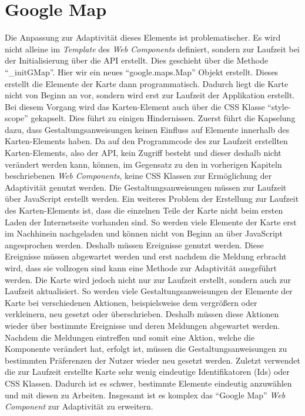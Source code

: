 \documentclass[12pt, paper=a4, bibtotoc, toc=listof, headsepline=true]{scrreprt}
\begin{document}
	\section{Google Map}
	\label{sec:fazGogMap}
	Die Anpassung zur Adaptivität dieses Elements ist problematischer.
	Es wird nicht alleine im \emph{Template} des \emph{Web Components} definiert, sondern zur Laufzeit bei der Initialisierung über die \ac{API} erstellt. Dies geschieht über die Methode \enquote{\_initGMap}. Hier wir ein neues \enquote{google.maps.Map} Objekt erstellt. Dieses erstellt die Elemente der Karte dann programmatisch. Dadurch liegt die Karte nicht von Beginn an vor, sondern wird erst zur Laufzeit der Applikation erstellt. Bei diesem Vorgang wird das Karten-Element auch über die \ac{CSS} Klasse \enquote{style-scope} gekapselt. Dies führt zu einigen Hindernissen. Zuerst führt die Kapselung dazu, dass Gestaltungsanweisungen keinen Einfluss auf Elemente innerhalb des Karten-Elements haben. Da auf den Programmcode des zur Laufzeit erstellten Karten-Elements, also der \ac{API}, kein Zugriff besteht und dieser deshalb  nicht verändert werden kann, können, im Gegensatz zu den in vorherigen Kapiteln beschriebenen \emph{Web Components}, keine \ac{CSS} Klassen zur Ermöglichung der Adaptivität genutzt werden. Die Gestaltungsanweisungen müssen zur Laufzeit über JavaScript erstellt werden. Ein weiteres Problem der Erstellung zur Laufzeit des Karten-Elements ist, dass die einzelnen Teile der Karte nicht beim ersten Laden der Internetseite vorhanden sind. So werden viele Elemente der Karte erst im Nachhinein nachgeladen und können nicht von Beginn an über JavaScript angesprochen werden. Deshalb müssen Ereignisse genutzt werden. Diese Ereignisse müssen abgewartet werden und erst nachdem die Meldung erbracht wird, dass sie vollzogen sind kann eine Methode zur Adaptivität ausgeführt werden. Die Karte wird jedoch nicht nur zur Laufzeit erstellt, sondern auch zur Laufzeit aktualisiert. So werden viele Gestaltungsanweisungen der Elemente der Karte bei verschiedenen Aktionen, beispielsweise dem vergrößern oder verkleinern, neu gesetzt oder überschrieben. Deshalb müssen diese Aktionen wieder über bestimmte Ereignisse und deren Meldungen abgewartet werden. Nachdem die Meldungen eintreffen und somit eine Aktion, welche die Komponente verändert hat, erfolgt ist, müssen die Gestaltungsanweisungen zu bestimmten Präferenzen der Nutzer wieder neu gesetzt werden. Zuletzt verwendet die zur Laufzeit erstellte Karte sehr wenig eindeutige Identifikatoren (Ids) oder \ac{CSS} Klassen. Dadurch ist es schwer, bestimmte Elemente eindeutig anzuwählen und mit diesen zu Arbeiten. Insgesamt ist es komplex das \enquote{Google Map} \emph{Web Component} zur Adaptivität zu erweitern.
	
\end{document}
